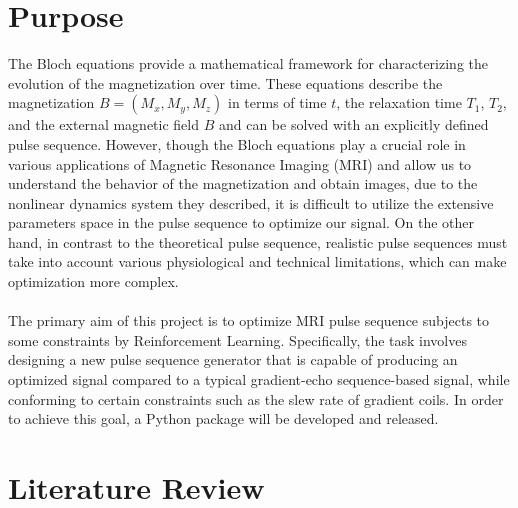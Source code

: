 \section{Purpose}
The Bloch equations provide a mathematical framework for characterizing the evolution of the magnetization over time. These equations describe the magnetization $B=(M_x, M_y, M_z)$ in terms of time $t$, the relaxation time $T_1$, $T_2$, and the external magnetic field $B$ and can be solved with an explicitly defined pulse sequence. However, though the Bloch equations play a crucial role in various applications of Magnetic Resonance Imaging (MRI) and allow us to understand the behavior of the magnetization and obtain images, due to the nonlinear dynamics system they described, it is difficult to utilize the extensive parameters space in the pulse sequence to optimize our signal. On the other hand, in contrast to the theoretical pulse sequence, realistic pulse sequences must take into account various physiological and technical limitations, which can make optimization more complex.
\\\\
The primary aim of this project is to optimize MRI pulse sequence subjects to some constraints by Reinforcement Learning. Specifically, the task involves designing a new pulse sequence generator that is capable of producing an optimized signal compared to a typical gradient-echo sequence-based signal, while conforming to certain constraints such as the slew rate of gradient coils. In order to achieve this goal, a Python package will be developed and released.
\section{Literature Review}

